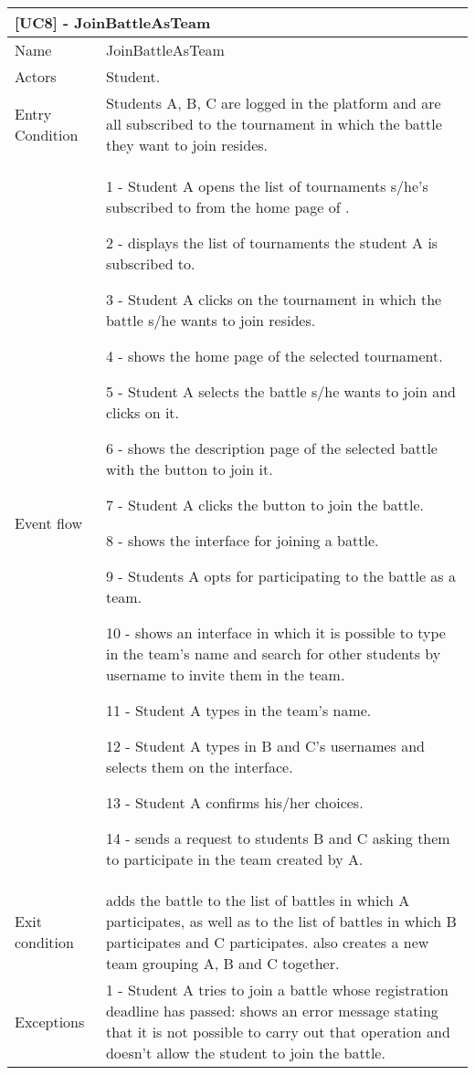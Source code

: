    
	
	\begin{longtable}{|p{3cm}p{14cm}|}
		\multicolumn{2}{l}{\textbf{[UC8] - JoinBattleAsTeam}}\\
		\hline
		Name & JoinBattleAsTeam \\
		\hline
		Actors & Student. \\
		\hline
		Entry Condition & Students A, B, C are logged in the platform and are all subscribed to the tournament in which the battle they want to join resides.\\
		\hline
		Event flow &  
		1 - Student A opens the list of tournaments s/he's subscribed to from the home page of \app.
		
		2 - \app displays the list of tournaments the student A is subscribed to.
		
		3 - Student A clicks on the tournament in which the battle s/he wants to join resides.
		
		4 - \app shows the home page of the selected tournament.
		
		5 - Student A selects the battle s/he wants to join and clicks on it.
		
		6 - \app shows the description page of the selected battle with the button to join it.
		
		7 - Student A clicks the button to join the battle.
		
		8 - \app shows the interface for joining a battle.
		
		9 - Students A opts for participating to the battle as a team.
		
		10 - \app shows an interface in which it is possible to type in the team's name and search for other students by username to invite them in the team.
		
		11 - Student A types in the team's name.
		
		12 - Student A types in B and C's usernames and selects them on the interface.
		
		13 - Student A confirms his/her choices.
		
		14 - \app sends a request to students B and C asking them to participate in the team created by A.
		
		\\
		\hline
		Exit condition & \app adds the battle to the list of battles in which A participates, as well as to the list of battles in which B participates and C participates. \app also creates a new team grouping A, B and C together.\\
		\hline
		Exceptions & 
		1 - Student A tries to join a battle whose registration deadline has passed: \app shows an error message stating that it is not possible to carry out that operation and doesn't allow the student to join the battle.
		

\end{longtable}
